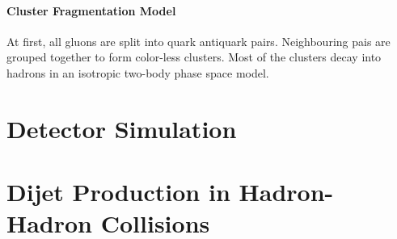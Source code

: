 \paragraph{Cluster Fragmentation Model}

At first, all gluons are split into quark antiquark pairs. Neighbouring pais are
grouped together to form color-less clusters. Most of the clusters decay into
hadrons in an isotropic two-body phase space model.

\section{Detector Simulation}

\section{Dijet Production in Hadron-Hadron Collisions}
